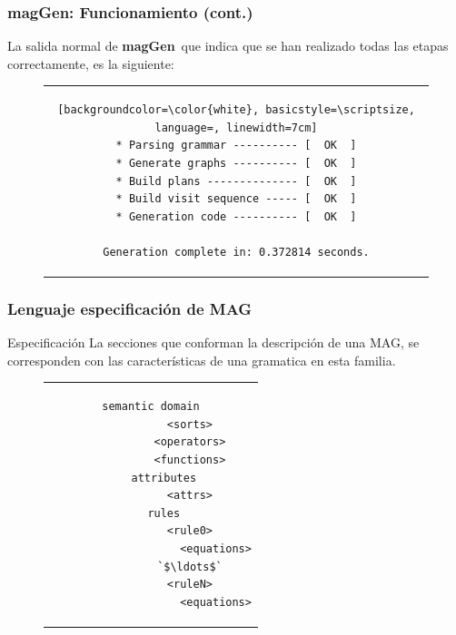 \documentclass[10pt]{beamer}
\newcommand{\maggen}{\textbf{magGen}}
\begin{document}
\begin{frame}[fragile]
    \frametitle{\maggen: Funcionamiento (cont.)}

    La salida normal de \maggen\ que indica que se han realizado todas las etapas correctamente, es la siguiente:


\begin{figure}[h]
\begin{center}
\begin{tabular}{c}
\begin{lstlisting}[backgroundcolor=\color{white}, basicstyle=\scriptsize, language=, linewidth=7cm]
* Parsing grammar ---------- [  OK  ]
* Generate graphs ---------- [  OK  ]
* Build plans -------------- [  OK  ]
* Build visit sequence ----- [  OK  ]
* Generation code ---------- [  OK  ]

Generation complete in: 0.372814 seconds.
\end{lstlisting}
\end{tabular}
\end{center}
\end{figure}
\end{frame}

\begin{frame}[fragile]
    \frametitle{Lenguaje especificación de MAG}
    \begin{block}{Especificación}
    La secciones que conforman la descripción de una MAG, se corresponden con las características de una gramatica en esta familia.
    \end{block}
    
\begin{figure}[h]
\begin{center}
\begin{tabular}{c}
 \begin{lstlisting}[language=specmag, basicstyle=\small, linewidth=7cm]
    semantic domain
            <sorts>
            <operators>
            <functions>
    attributes
            <attrs>
    rules
            <rule0>
                    <equations>
            `$\ldots$`
            <ruleN>
                    <equations>
\end{lstlisting} 
\end{tabular}
\end{center}
\end{figure}
\end{frame}
\end{document}

